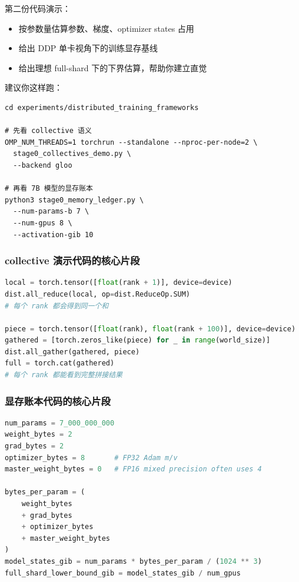 第二份代码演示：
\begin{itemize}[leftmargin=1.5em]
  \item 按参数量估算参数、梯度、optimizer states 占用
  \item 给出 DDP 单卡视角下的训练显存基线
  \item 给出理想 full-shard 下的下界估算，帮助你建立直觉
\end{itemize}

建议你这样跑：

\begin{lstlisting}
cd experiments/distributed_training_frameworks

# 先看 collective 语义
OMP_NUM_THREADS=1 torchrun --standalone --nproc-per-node=2 \
  stage0_collectives_demo.py \
  --backend gloo

# 再看 7B 模型的显存账本
python3 stage0_memory_ledger.py \
  --num-params-b 7 \
  --num-gpus 8 \
  --activation-gib 10
\end{lstlisting}

\subsubsection*{collective 演示代码的核心片段}

\begin{lstlisting}[language=Python, caption=all\_reduce 和 all\_gather 的最小例子]
local = torch.tensor([float(rank + 1)], device=device)
dist.all_reduce(local, op=dist.ReduceOp.SUM)
# 每个 rank 都会得到同一个和

piece = torch.tensor([float(rank), float(rank + 100)], device=device)
gathered = [torch.zeros_like(piece) for _ in range(world_size)]
dist.all_gather(gathered, piece)
full = torch.cat(gathered)
# 每个 rank 都能看到完整拼接结果
\end{lstlisting}

\subsubsection*{显存账本代码的核心片段}

\begin{lstlisting}[language=Python, caption=训练模型状态显存的最小估算]
num_params = 7_000_000_000
weight_bytes = 2
grad_bytes = 2
optimizer_bytes = 8       # FP32 Adam m/v
master_weight_bytes = 0   # FP16 mixed precision often uses 4

bytes_per_param = (
    weight_bytes
    + grad_bytes
    + optimizer_bytes
    + master_weight_bytes
)
model_states_gib = num_params * bytes_per_param / (1024 ** 3)
full_shard_lower_bound_gib = model_states_gib / num_gpus
\end{lstlisting}

